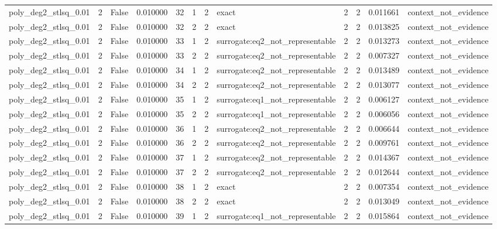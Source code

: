 \begin{tabular}{lrrrrrrlrrrl}
poly\_deg2\_stlsq\_0.01 & 2 & False & 0.010000 & 32 & 1 & 2 & exact & 2 & 2 & 0.011661 & context\_not\_evidence \\
poly\_deg2\_stlsq\_0.01 & 2 & False & 0.010000 & 32 & 2 & 2 & exact & 2 & 2 & 0.013825 & context\_not\_evidence \\
poly\_deg2\_stlsq\_0.01 & 2 & False & 0.010000 & 33 & 1 & 2 & surrogate:eq2\_not\_representable & 2 & 2 & 0.013273 & context\_not\_evidence \\
poly\_deg2\_stlsq\_0.01 & 2 & False & 0.010000 & 33 & 2 & 2 & surrogate:eq2\_not\_representable & 2 & 2 & 0.007327 & context\_not\_evidence \\
poly\_deg2\_stlsq\_0.01 & 2 & False & 0.010000 & 34 & 1 & 2 & surrogate:eq2\_not\_representable & 2 & 2 & 0.013489 & context\_not\_evidence \\
poly\_deg2\_stlsq\_0.01 & 2 & False & 0.010000 & 34 & 2 & 2 & surrogate:eq2\_not\_representable & 2 & 2 & 0.013077 & context\_not\_evidence \\
poly\_deg2\_stlsq\_0.01 & 2 & False & 0.010000 & 35 & 1 & 2 & surrogate:eq1\_not\_representable & 2 & 2 & 0.006127 & context\_not\_evidence \\
poly\_deg2\_stlsq\_0.01 & 2 & False & 0.010000 & 35 & 2 & 2 & surrogate:eq1\_not\_representable & 2 & 2 & 0.006056 & context\_not\_evidence \\
poly\_deg2\_stlsq\_0.01 & 2 & False & 0.010000 & 36 & 1 & 2 & surrogate:eq2\_not\_representable & 2 & 2 & 0.006644 & context\_not\_evidence \\
poly\_deg2\_stlsq\_0.01 & 2 & False & 0.010000 & 36 & 2 & 2 & surrogate:eq2\_not\_representable & 2 & 2 & 0.009761 & context\_not\_evidence \\
poly\_deg2\_stlsq\_0.01 & 2 & False & 0.010000 & 37 & 1 & 2 & surrogate:eq2\_not\_representable & 2 & 2 & 0.014367 & context\_not\_evidence \\
poly\_deg2\_stlsq\_0.01 & 2 & False & 0.010000 & 37 & 2 & 2 & surrogate:eq2\_not\_representable & 2 & 2 & 0.012644 & context\_not\_evidence \\
poly\_deg2\_stlsq\_0.01 & 2 & False & 0.010000 & 38 & 1 & 2 & exact & 2 & 2 & 0.007354 & context\_not\_evidence \\
poly\_deg2\_stlsq\_0.01 & 2 & False & 0.010000 & 38 & 2 & 2 & exact & 2 & 2 & 0.013049 & context\_not\_evidence \\
poly\_deg2\_stlsq\_0.01 & 2 & False & 0.010000 & 39 & 1 & 2 & surrogate:eq1\_not\_representable & 2 & 2 & 0.015864 & context\_not\_evidence \\

\end{tabular}
